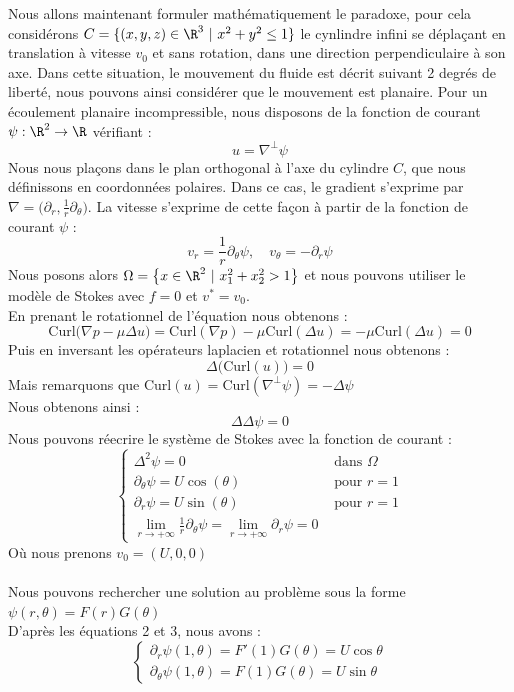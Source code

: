 Nous allons maintenant formuler mathématiquement le paradoxe, pour cela considérons $C = \{ (x,y,z) \in \R^3 \ | \ x^2 + y^2 \leq 1 \} $ le cynlindre infini se déplaçant en translation à vitesse $v_0$ et sans rotation, dans une direction perpendiculaire à son axe.
Dans cette situation, le mouvement du fluide est décrit suivant 2 degrés de liberté, nous pouvons ainsi considérer que le mouvement est planaire.
Pour un écoulement planaire incompressible, nous disposons de la fonction de courant $\psi : \R^2 \to \R $ vérifiant :
$$ u = \nabla^{\perp}\psi $$
Nous nous plaçons dans le plan orthogonal à l'axe du cylindre $C$, que nous définissons en coordonnées polaires. Dans ce cas, le gradient s'exprime par $\nabla = \big(\partial_r, \frac{1}{r}\partial_{\theta}\big) $. La vitesse s'exprime de cette façon à partir de la fonction de courant $\psi$ :
$$v_r = \frac{1}{r} \partial_{\theta} \psi, \quad v_{\theta} = -\partial_r \psi $$
Nous posons alors $\Omega = \big\{ x \in \R^2 \ | \ x_1^2 + x_2^2 > 1 \big\}$ et nous pouvons utiliser le modèle de Stokes avec $f=0$ et $v^* = v_0$.\\
En prenant le rotationnel de l'équation nous obtenons :
$$\text{Curl} \big( \nabla p - \mu \Delta u \big) =  \text{Curl}( \nabla p) - \mu \text{Curl}(\Delta u) = -\mu \text{Curl}(\Delta u) = 0 $$
Puis en inversant les opérateurs laplacien et rotationnel nous obtenons :
$$\Delta \big( \text{Curl}(u) \big) = 0$$
Mais remarquons que $\text{Curl}(u) = \text{Curl} (\nabla^{\perp}\psi) = - \Delta \psi$\\
Nous obtenons ainsi :
$$\Delta \Delta \psi = 0$$
Nous pouvons réecrire le système de Stokes avec la fonction de courant :
$$\begin{cases}
    \Delta^2 \psi = 0 \quad &\text{ dans } \Omega \\
    \partial_{\theta} \psi = U \cos(\theta) \quad &\text{ pour } r=1 \\
    \partial_r \psi = U \sin(\theta) \quad &\text{ pour } r=1 \\
    \underset{r \to +\infty}{\lim} \frac{1}{r} \partial_{\theta} \psi = \underset{r \to +\infty}{\lim} \partial_r \psi = 0
\end{cases}$$
Où nous prenons $v_0 = (U,0,0)$\\
\\
Nous pouvons rechercher une solution au problème sous la forme $\psi(r,\theta) = F(r)G(\theta) $\\
D'après les équations 2 et 3, nous avons :
$$\begin{cases}
    \partial_{r} \psi(1,\theta) = F'(1)G(\theta) = U \cos \theta \\
    \partial_{\theta} \psi(1,\theta) = F(1)G(\theta) = U \sin \theta
\end{cases}$$
